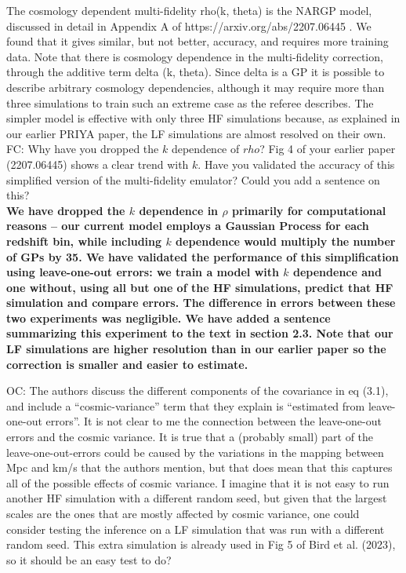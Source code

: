 \documentclass[12pt]{article}
\begin{document}
The cosmology dependent multi-fidelity rho(k, theta) is the NARGP model, discussed in detail in Appendix A of https://arxiv.org/abs/2207.06445 . We found that it gives similar, but not better, accuracy, and requires more training data. Note that there is cosmology dependence in the multi-fidelity correction, through the additive term delta (k, theta). Since delta is a GP it is possible to describe arbitrary cosmology dependencies, although it may require more than three simulations to train such an extreme case as the referee describes. The simpler model is effective with only three HF simulations because, as explained in our earlier PRIYA paper, the LF simulations are almost resolved on their own.\\

FC: Why have you dropped the $k$ dependence of $rho$? Fig 4 of your earlier paper (2207.06445) shows a clear trend with $k$. Have you validated the accuracy of this simplified version of the multi-fidelity emulator? Could you add a sentence on this?\\

\textbf{We have dropped the $k$ dependence in $\rho$ primarily for computational reasons -- our current model employs a Gaussian Process for each redshift bin, while including $k$ dependence would multiply the number of GPs by 35. We have validated the performance of this simplification using leave-one-out errors: we train a model with $k$ dependence and one without, using all but one of the HF simulations, predict that HF simulation and compare errors. The difference in errors between these two experiments was negligible. We have added a sentence summarizing this experiment to the text in section 2.3. Note that our LF simulations are higher resolution than in our earlier paper so the correction is smaller and easier to estimate.}\\

\hrulefill \newline

OC: The authors discuss the different components of the covariance in eq (3.1), and include a “cosmic-variance” term that they explain is “estimated from leave-one-out errors”. It is not clear to me the connection between the leave-one-out errors and the cosmic variance. It is true that a (probably small) part of the leave-one-out-errors could be caused by the variations in the mapping between Mpc and km/s that the authors mention, but that does mean that this captures all of the possible effects of cosmic variance. I imagine that it is not easy to run another HF simulation with a different random seed, but given that the largest scales are the ones that are mostly affected by cosmic variance, one could consider testing the inference on a LF simulation that was run with a different random seed. This extra simulation is already used in Fig 5 of Bird et al. (2023), so it should be an easy test to do?\\
\end{document}
